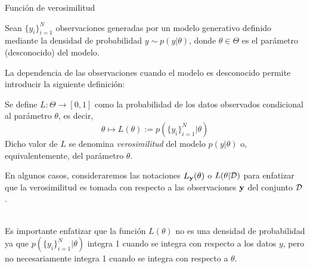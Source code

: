 \documentclass[9pt]{beamer}
\begin{document}
\begin{frame}{Función de verosimilitud}

Sean $\{y_i\}_{i=1}^N$ observaciones generadas por un modelo generativo definido mediante la densidad de  probabilidad  $y\sim p(y|\theta)$, donde $\theta\in\Theta$ es el parámetro (desconocido) del modelo.\pause
	
La dependencia de las observaciones cuando el modelo es desconocido permite introducir la siguiente definición:

\begin{definition}[verosimilitud]
Se define $L: \Theta \to [0,1]$ como la probabilidad de los datos observados condicional al parámetro $\theta$, es decir, 
\begin{equation*}
			\theta   \mapsto L(\theta) :=  p(\{y_i\}_{i=1}^N | \theta)
\end{equation*}
Dicho valor de $L$ se denomina \emph{verosimilitud} del modelo $p(y|\theta)$ o, equivalentemente, del  parámetro $\theta$. 
\end{definition}\pause

En algunos casos, consideraremos las notaciones $L_{\mathbf{y}}(\theta)$ o $L(\theta|{\mathcal D})$ para enfatizar que la verosimilitud es tomada con respecto a las observaciones  $\mathbf{y}$ del conjunto ${\mathcal D}$.\\~\ \pause
	
Es importante enfatizar que la función $L(\theta)$ no es una densidad de probabilidad ya que $p(\{y_i\}_{i=1}^N | \theta)$ integra 1 cuando se integra con respecto a los datos $y$, pero no necesariamente integra 1 cuando se integra con respecto a $\theta$.
	
\end{frame}
\end{document}
